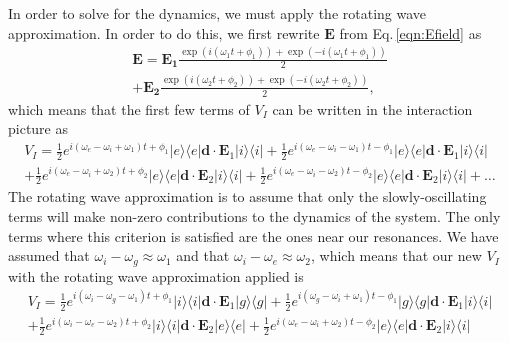 In order to solve for the dynamics, we must apply the rotating wave approximation. 
In order to do this, we first rewrite $\mathbf{E}$ from Eq.\,\ref{eqn:Efield} as 
\begin{multline}
\label{Ebreakdown}
\mathbf{E}=\mathbf{E_1}\frac{\exp(i (\omega_1 t + \phi_1))+\exp(-i(\omega_1 t +\phi_1))}{2}\\
+\mathbf{E_2}\frac{\exp(i (\omega_2 t + \phi_2))+\exp(-i(\omega_2 t +\phi_2))}{2},
\end{multline}
which means that the first few terms of $V_I$ can be written in the interaction picture as
\begin{multline}
\label{Vbreakdown}
V_I=\frac{1}{2}e^{i(\omega_e-\omega_i+\omega_1)t+\phi_1}|e\rangle\langle e|\mathbf{d}\cdot\mathbf{E}_1| i\rangle\langle i | + \frac{1}{2}e^{i(\omega_e-\omega_i-\omega_1)t-\phi_1}|e\rangle\langle e|\mathbf{d}\cdot\mathbf{E}_1| i\rangle\langle i| \\
+
\frac{1}{2}e^{i(\omega_e-\omega_i+\omega_2)t+\phi_2}|e\rangle\langle e|\mathbf{d}\cdot\mathbf{E}_2| i\rangle\langle i| + \frac{1}{2}e^{i(\omega_e-\omega_i-\omega_2)t-\phi_2}|e\rangle\langle e|\mathbf{d}\cdot\mathbf{E}_2| i\rangle\langle i| +
\ldots
\end{multline}
The rotating wave approximation is to assume that only the slowly-oscillating terms will make non-zero contributions to the dynamics of the system. %
The only terms where this criterion is satisfied are the ones near our resonances. 
We have assumed that $\omega_i-\omega_g\approx\omega_1$ and that $\omega_i-\omega_e\approx\omega_2$, which means that our new $V_I$ with the rotating wave approximation applied is
\begin{multline}
V_I=\frac{1}{2}e^{i(\omega_i-\omega_g-\omega_1)t+\phi_1}|i\rangle\langle i|\mathbf{d}\cdot\mathbf{E}_1| g\rangle\langle g | + \frac{1}{2}e^{i(\omega_g-\omega_i+\omega_1)t-\phi_1}|g\rangle\langle g|\mathbf{d}\cdot\mathbf{E}_1| i\rangle\langle i| \\
+
\frac{1}{2}e^{i(\omega_i-\omega_e-\omega_2)t+\phi_2}|i\rangle\langle i|\mathbf{d}\cdot\mathbf{E}_2| e\rangle\langle e| + \frac{1}{2}e^{i(\omega_e-\omega_i+\omega_2)t-\phi_2}|e\rangle\langle e|\mathbf{d}\cdot\mathbf{E}_2| i\rangle\langle i| 
\end{multline}

